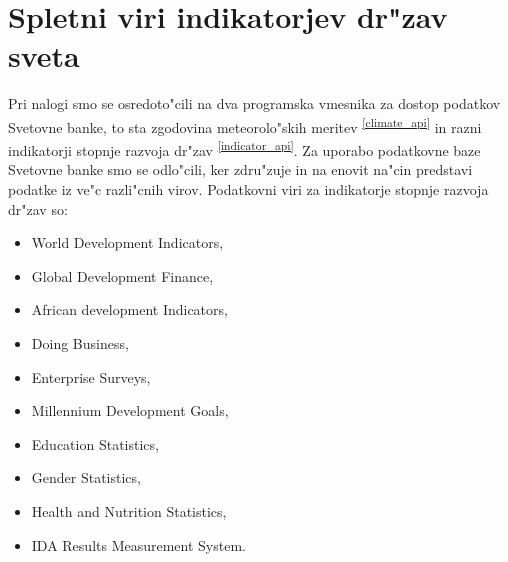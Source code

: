 \chapter{Spletni viri indikatorjev dr"zav sveta}

% 


Pri nalogi smo se osredoto"cili na dva programska vmesnika za dostop podatkov 
Svetovne banke, to sta zgodovina meteorolo"skih meritev 
\textsuperscript{\ref{climate_api}} in 
razni indikatorji stopnje razvoja dr"zav \textsuperscript{\ref{indicator_api}}.
Za uporabo podatkovne baze Svetovne banke smo se odlo"cili, ker zdru"zuje in na
enovit na"cin predstavi podatke iz ve"c razli"cnih virov. Podatkovni viri za 
indikatorje
stopnje razvoja dr"zav so:

% 
% 
% 
% 



\begin{itemize}  
\item World Development Indicators, 
\item Global Development Finance, 
\item African development Indicators, 
\item Doing Business,
\item Enterprise Surveys, 
\item Millennium Development Goals, 
\item Education Statistics, 
\item Gender Statistics,
\item Health and Nutrition Statistics, 
\item IDA Results Measurement System.
\end{itemize}  

